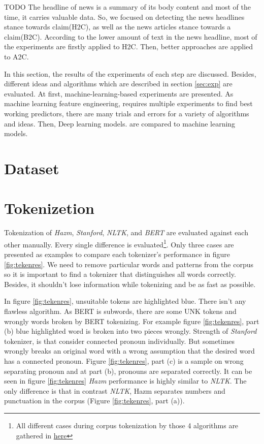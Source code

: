 {\color{green} TODO}
The headline of news is a summary of its body content and most of the time, it carries valuable data. So, we focused on detecting the news headlines stance towards claim(H2C), as well as the news articles stance towards a claim(B2C). According to the lower amount of text in the news headline, most of the experiments are firstly applied to H2C. Then, better approaches are applied to A2C.  


In this section, the results of the experiments of each step are discussed. Besides, different ideas and algorithms which are described in section \ref{sec:exp} are evaluated. At first, machine-learning-based experiments are presented. As machine learning feature engineering, requires multiple experiments to find best working predictors, there are many trials and errors for a variety of algorithms and ideas. Then, Deep learning models. are compared to machine learning models.

\section{Dataset}
\label{sec:dataset}



\section{Tokenizetion}
Tokenization of \textit{Hazm}, \textit{Stanford}, \textit{NLTK}, and \textit{BERT} are evaluated against each other manually. Every single difference is evaluated\footnote{All different cases during corpus tokenization by those 4 algorithms are gathered in \href{https://docs.google.com/document/d/1SlRBnoyLntLJ5yalWXZ1EqJ0wRj4DyiEMJdewkEkrTM/edit?usp=sharing}{here}}. Only three cases are presented as examples to compare each tokenizer's performance in figure \ref{fig:tekenres}. We need to remove particular words and patterns from the corpus so  it is important to find a tokenizer that distinguishes all words correctly. Besides, it shouldn't lose information while tokenizing and be as fast as possible. 

In figure \ref{fig:tekenres}, unsuitable tokens are highlighted  blue. There isn't any flawless algorithm. As BERT is  subwords, there are some UNK tokens and wrongly words broken by BERT tokenizing. For example figure \ref{fig:tekenres}, part (b) blue highlighted word is broken into two pieces wrongly. Strength of \textit{Stanford} tokenizer, is that consider connected pronoun individually. But sometimes  wrongly breaks an original word with a wrong assumption that the desired word has a connected pronoun. Figure \ref{fig:tekenres}, part (c) is a sample on wrong separating pronoun and at part (b), pronouns are separated correctly. It can be seen in figure \ref{fig:tekenres} \textit{Hazm} performance is highly similar to \textit{NLTK}. The only difference is that in contrast \textit{NLTK}, Hazm separates numbers and punctuation in the corpus (Figure \ref{fig:tekenres}, part (a)). 

